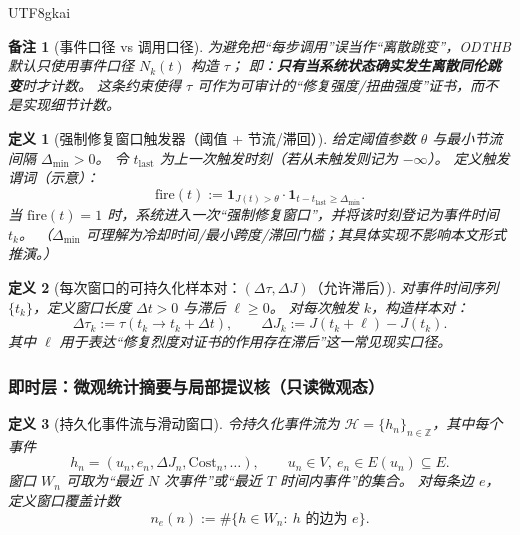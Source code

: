 \documentclass[12pt]{article}
\newtheorem{definition}{定义}[section]
\newtheorem{remark}{备注}[section]
\newcommand{\ZZ}{\mathbb{Z}}
\newcommand{\indicator}[1]{\mathbf{1}_{#1}}
\begin{document}
\begin{CJK*}{UTF8}{gkai}
\begin{remark}[事件口径 vs 调用口径]
为避免把“每步调用”误当作“离散跳变”，ODTHB 默认只使用事件口径 $N_k(t)$ 构造 $\tau$；
即：\textbf{只有当系统状态确实发生离散同伦跳变}时才计数。
这条约束使得 $\tau$ 可作为可审计的“修复强度/扭曲强度”证书，而不是实现细节计数。
\end{remark}

\begin{definition}[强制修复窗口触发器（阈值 + 节流/滞回）]
\label{def:tex27-ch5-odthb-trigger}
给定阈值参数 $\theta$ 与最小节流间隔 $\Delta_{\min}>0$。
令 $t_{\mathrm{last}}$ 为上一次触发时刻（若从未触发则记为 $-\infty$）。
定义触发谓词（示意）：
\[
  \mathrm{fire}(t):=\indicator{J(t)>\theta}\cdot \indicator{t-t_{\mathrm{last}}\ge \Delta_{\min}}.
\]
当 $\mathrm{fire}(t)=1$ 时，系统进入一次“强制修复窗口”，并将该时刻登记为事件时间 $t_k$。
（$\Delta_{\min}$ 可理解为冷却时间/最小跨度/滞回门槛；其具体实现不影响本文形式推演。）
\end{definition}

\begin{definition}[每次窗口的可持久化样本对：$(\Delta\tau,\Delta J)$（允许滞后）]
\label{def:tex27-ch5-odthb-samples}
对事件时间序列 $\{t_k\}$，定义窗口长度 $\Delta t>0$ 与滞后 $\ell\ge 0$。
对每次触发 $k$，构造样本对：
\[
  \Delta\tau_k:=\tau(t_k\to t_k+\Delta t),\qquad
  \Delta J_k:=J(t_k+\ell)-J(t_k).
\]
其中 $\ell$ 用于表达“修复烈度对证书的作用存在滞后”这一常见现实口径。
\end{definition}

\subsubsection{即时层：微观统计摘要与局部提议核（只读微观态）}
\label{subsubsec:tex27-ch5-odthb-fast}

\begin{definition}[持久化事件流与滑动窗口]
\label{def:tex27-ch5-odthb-window}
令持久化事件流为 $\mathcal{H}=\{h_n\}_{n\in\ZZ}$，其中每个事件
\[
  h_n=(u_n,e_n,\Delta J_n,\mathrm{Cost}_n,\ldots),
  \qquad
  u_n\in V,\ e_n\in E(u_n)\subseteq E.
\]
窗口 $W_n$ 可取为“最近 $N$ 次事件”或“最近 $T$ 时间内事件”的集合。
对每条边 $e$，定义窗口覆盖计数
\[
  n_e(n):=\#\{h\in W_n:\ h\text{ 的边为 }e\}.
\]
\end{definition}


\end{CJK*}
\end{document}
